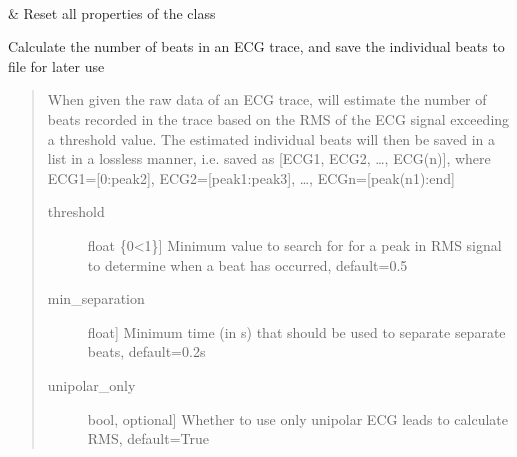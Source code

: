 \documentclass[letterpaper,10pt,english]{sphinxmanual}
\begin{document}
\begin{fulllineitems}
\begin{savenotes}
\begin{longtable}[c]{}
\\
\hline
\sphinxAtStartPar
{\hyperref[\detokenize{_autosummary/signalanalysis.ecg.Ecg:signalanalysis.ecg.Ecg.reset}]{}}
&
\sphinxAtStartPar
Reset all properties of the class
\\
\hline
\end{longtable}\sphinxatlongtableend\end{savenotes}

\begin{fulllineitems}
\label{\detokenize{_autosummary/signalanalysis.ecg.Ecg:id0}}
\sphinxAtStartPar
Calculate the number of beats in an ECG trace, and save the individual beats to file for later use
\begin{quote}

\sphinxAtStartPar
When given the raw data of an ECG trace, will estimate the number of beats recorded in the trace based on the
RMS of the ECG signal exceeding a threshold value. The estimated individual beats will then be saved in a
list in a lossless manner, i.e. saved as {[}ECG1, ECG2, …, ECG(n){]}, where ECG1={[}0:peak2{]}, ECG2={[}peak1:peak3{]},
…, ECGn={[}peak(n\sphinxhyphen{}1):end{]}
\begin{description}
\item[{threshold}] \leavevmode{[}float \{0\textless{}1\}{]}
\sphinxAtStartPar
Minimum value to search for for a peak in RMS signal to determine when a beat has occurred, default=0.5

\item[{min\_separation}] \leavevmode{[}float{]}
\sphinxAtStartPar
Minimum time (in s) that should be used to separate separate beats, default=0.2s

\item[{unipolar\_only}] \leavevmode{[}bool, optional{]}
\sphinxAtStartPar
Whether to use only unipolar ECG leads to calculate RMS, default=True


\end{description}
\end{quote}
\end{fulllineitems}
\end{fulllineitems}
\end{document}
